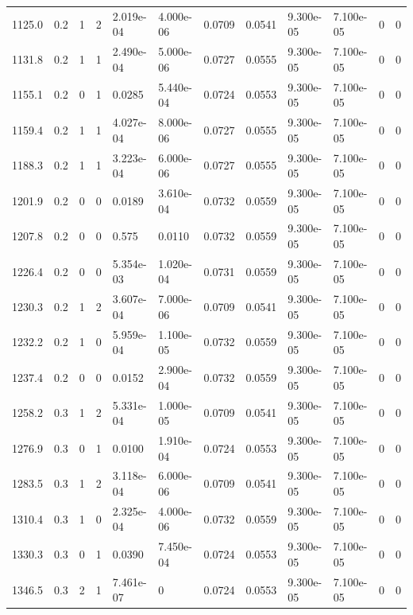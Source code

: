 \documentclass[preview]{standalone}
\begin{document}
{{{\begin{tabular}{L{1.2cm}C{1.2cm} C{0.3cm}C{0.5cm} C{1.4cm}C{1.4cm} C{1.4cm}C{1.4cm} C{1.6cm}C{1.6cm} C{1.6cm}C{1.6cm}}
  1125.0  &   0.2  & 1     &  2 &  2.019e-04  & 4.000e-06  &  0.0709&   0.0541& 9.300e-05 & 7.100e-05   &  0 & 0  \\ 
  1131.8  &   0.2  & 1     &  1 &  2.490e-04  & 5.000e-06  &  0.0727&   0.0555& 9.300e-05 & 7.100e-05   &  0 & 0  \\ 
  1155.1  &   0.2  & 0     &  1 &  0.0285  & 5.440e-04  &  0.0724&   0.0553& 9.300e-05 & 7.100e-05   &  0 & 0  \\ 
  1159.4  &   0.2  & 1     &  1 &  4.027e-04  & 8.000e-06  &  0.0727&   0.0555& 9.300e-05 & 7.100e-05   &  0 & 0  \\ 
  1188.3  &   0.2  & 1     &  1 &  3.223e-04  & 6.000e-06  &  0.0727&   0.0555& 9.300e-05 & 7.100e-05   &  0 & 0  \\ 
  1201.9  &   0.2  & 0     &  0 &  0.0189  & 3.610e-04  &  0.0732&   0.0559& 9.300e-05 & 7.100e-05   &  0 & 0  \\ 
  1207.8  &   0.2  & 0     &  0 &  0.575  & 0.0110  &  0.0732&   0.0559& 9.300e-05 & 7.100e-05   &  0 & 0  \\ 
  1226.4  &   0.2  & 0     &  0 &  5.354e-03  & 1.020e-04  &  0.0731&   0.0559& 9.300e-05 & 7.100e-05   &  0 & 0  \\ 
  1230.3  &   0.2  & 1     &  2 &  3.607e-04  & 7.000e-06  &  0.0709&   0.0541& 9.300e-05 & 7.100e-05   &  0 & 0  \\ 
  1232.2  &   0.2  & 1     &  0 &  5.959e-04  & 1.100e-05  &  0.0732&   0.0559& 9.300e-05 & 7.100e-05   &  0 & 0  \\ 
  1237.4  &   0.2  & 0     &  0 &  0.0152  & 2.900e-04  &  0.0732&   0.0559& 9.300e-05 & 7.100e-05   &  0 & 0  \\ 
  1258.2  &   0.3  & 1     &  2 &  5.331e-04  & 1.000e-05  &  0.0709&   0.0541& 9.300e-05 & 7.100e-05   &  0 & 0  \\ 
  1276.9  &   0.3  & 0     &  1 &  0.0100  & 1.910e-04  &  0.0724&   0.0553& 9.300e-05 & 7.100e-05   &  0 & 0  \\ 
  1283.5  &   0.3  & 1     &  2 &  3.118e-04  & 6.000e-06  &  0.0709&   0.0541& 9.300e-05 & 7.100e-05   &  0 & 0  \\ 
  1310.4  &   0.3  & 1     &  0 &  2.325e-04  & 4.000e-06  &  0.0732&   0.0559& 9.300e-05 & 7.100e-05   &  0 & 0  \\ 
  1330.3  &   0.3  & 0     &  1 &  0.0390  & 7.450e-04  &  0.0724&   0.0553& 9.300e-05 & 7.100e-05   &  0 & 0  \\ 
  1346.5  &   0.3  & 2     &  1 &  7.461e-07  & 0  &  0.0724&   0.0553& 9.300e-05 & 7.100e-05   &  0 & 0  \\ 

\end{tabular}}}}
\end{document}
